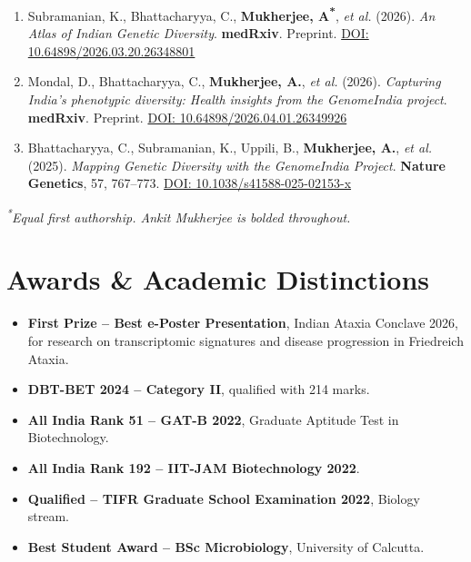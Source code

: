 \documentclass[10pt,a4paper]{article}
\begin{document}
\begin{enumerate}
\item Subramanian, K., Bhattacharyya, C., \textbf{Mukherjee, A\textsuperscript{*}}, \textit{et al.} (2026). \textit{An Atlas of Indian Genetic Diversity}. \textbf{medRxiv}. Preprint. \href{https://doi.org/10.64898/2026.03.20.26348801}{DOI: 10.64898/2026.03.20.26348801}

\item Mondal, D., Bhattacharyya, C., \textbf{Mukherjee, A.}, \textit{et al.} (2026). \textit{Capturing India’s phenotypic diversity: Health insights from the GenomeIndia project}. \textbf{medRxiv}. Preprint. \href{https://doi.org/10.64898/2026.04.01.26349926}{DOI: 10.64898/2026.04.01.26349926}

\item Bhattacharyya, C., Subramanian, K., Uppili, B., \textbf{Mukherjee, A.}, \textit{et al.} (2025). \textit{Mapping Genetic Diversity with the GenomeIndia Project}. \textbf{Nature Genetics}, 57, 767--773. \href{https://doi.org/10.1038/s41588-025-02153-x}{DOI: 10.1038/s41588-025-02153-x}
\end{enumerate}

\textit{\textsuperscript{*}Equal first authorship. Ankit Mukherjee is bolded throughout.}
\vspace{0.4em}


\section{Awards \& Academic Distinctions}

\begin{itemize}
\item \textbf{First Prize -- Best e-Poster Presentation}, Indian Ataxia Conclave 2026, for research on transcriptomic signatures and disease progression in Friedreich Ataxia.
\item \textbf{DBT-BET 2024 -- Category II}, qualified with 214 marks.
\item \textbf{All India Rank 51 -- GAT-B 2022}, Graduate Aptitude Test in Biotechnology.
\item \textbf{All India Rank 192 -- IIT-JAM Biotechnology 2022}.
\item \textbf{Qualified -- TIFR Graduate School Examination 2022}, Biology stream.
\item \textbf{Best Student Award -- BSc Microbiology}, University of Calcutta.
\end{itemize}
\end{document}
